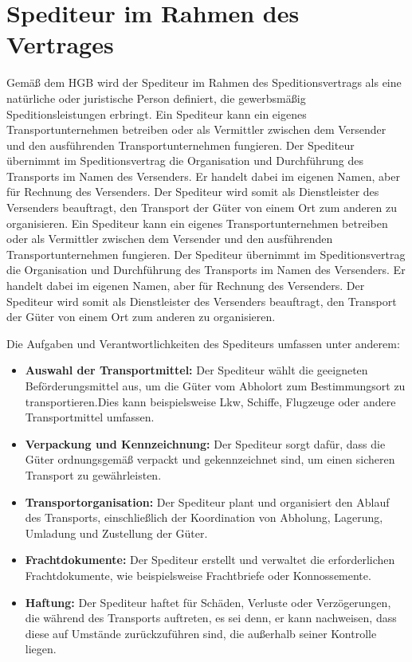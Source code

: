     \section{Spediteur im Rahmen des Vertrages}
    Gemäß dem \ac{HGB} wird der Spediteur im Rahmen des Speditionsvertrags als eine natürliche oder juristische Person definiert, die gewerbsmäßig Speditionsleistungen erbringt. Ein Spediteur kann ein eigenes Transportunternehmen betreiben oder als Vermittler zwischen dem Versender und den ausführenden Transportunternehmen fungieren.
    Der Spediteur übernimmt im Speditionsvertrag die Organisation und Durchführung des Transports im Namen des Versenders.
    Er handelt dabei im eigenen Namen, aber für Rechnung des Versenders.
    Der Spediteur wird somit als Dienstleister des Versenders beauftragt, den Transport der Güter von einem Ort zum anderen zu organisieren.
    Ein Spediteur kann ein eigenes Transportunternehmen betreiben oder als Vermittler zwischen dem Versender und den ausführenden Transportunternehmen fungieren.
    Der Spediteur übernimmt im Speditionsvertrag die Organisation und Durchführung des Transports im Namen des Versenders. Er handelt dabei im eigenen Namen, aber für Rechnung des Versenders.
    Der Spediteur wird somit als Dienstleister des Versenders beauftragt, den Transport der Güter von einem Ort zum anderen zu organisieren.

    Die Aufgaben und Verantwortlichkeiten des Spediteurs umfassen unter anderem:\nl
    \begin{itemize}
        \item \textbf{Auswahl der Transportmittel:}  Der Spediteur wählt die geeigneten Beförderungsmittel aus, um die Güter vom Abholort zum Bestimmungsort zu transportieren.Dies kann beispielsweise Lkw, Schiffe, Flugzeuge oder andere Transportmittel umfassen.
        \item \textbf{Verpackung und Kennzeichnung:} Der Spediteur sorgt dafür, dass die Güter ordnungsgemäß verpackt und gekennzeichnet sind, um einen sicheren Transport zu gewährleisten.
        \item \textbf{Transportorganisation:} Der Spediteur plant und organisiert den Ablauf des Transports, einschließlich der Koordination von Abholung, Lagerung, Umladung und Zustellung der Güter.
        \item \textbf{Frachtdokumente:} Der Spediteur erstellt und verwaltet die erforderlichen Frachtdokumente, wie beispielsweise Frachtbriefe oder Konnossemente.
        \item \textbf{Haftung:} Der Spediteur haftet für Schäden, Verluste oder Verzögerungen, die während des Transports auftreten, es sei denn, er kann nachweisen, dass diese auf Umstände zurückzuführen sind, die außerhalb seiner Kontrolle liegen.
    \end{itemize}

